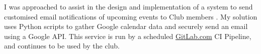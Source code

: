 \descript{ }
\vspace*{-\topsep}  %
\begin{justify}
I was approached to assist in the design and implementation of a system to send customised email notifications of upcoming events to Club members .
My solution uses Python scripts to gather Google calendar data and securely send an email using a Google API.
This service is run by a scheduled \href{https://gitlab.com/}{GitLab.com} CI Pipeline, and continues to be used by the club.
\end{justify}